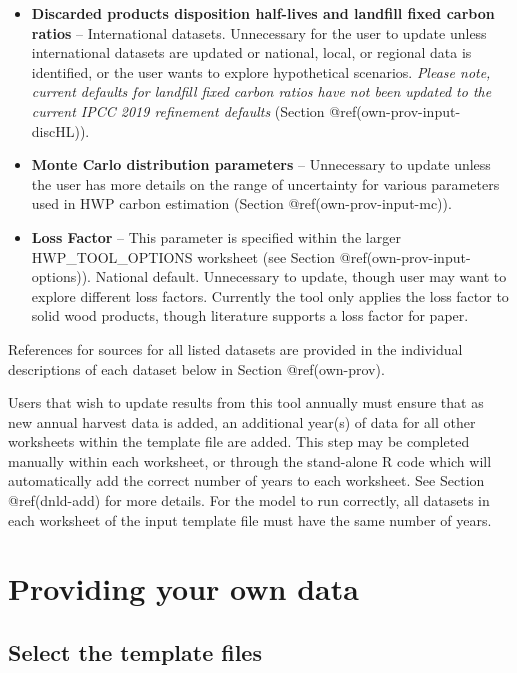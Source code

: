 \documentclass[
  openany]{book}
\begin{document}
\begin{itemize}
\item
  \textbf{Discarded products disposition half-lives and landfill fixed
  carbon ratios} -- International datasets. Unnecessary for the user to
  update unless international datasets are updated or national, local,
  or regional data is identified, or the user wants to explore
  hypothetical scenarios. \emph{Please note, current defaults for
  landfill fixed carbon ratios have not been updated to the current IPCC
  2019 refinement defaults} (Section @ref(own-prov-input-discHL)).
\item
  \textbf{Monte Carlo distribution parameters} -- Unnecessary to update
  unless the user has more details on the range of uncertainty for
  various parameters used in HWP carbon estimation (Section
  @ref(own-prov-input-mc)).
\item
  \textbf{Loss Factor} -- This parameter is specified within the larger
  HWP\_TOOL\_OPTIONS worksheet (see Section
  @ref(own-prov-input-options)). National default. Unnecessary to
  update, though user may want to explore different loss factors.
  Currently the tool only applies the loss factor to solid wood
  products, though literature supports a loss factor for paper.
\end{itemize}

References for sources for all listed datasets are provided in the
individual descriptions of each dataset below in Section @ref(own-prov).

Users that wish to update results from this tool annually must ensure
that as new annual harvest data is added, an additional year(s) of data
for all other worksheets within the template file are added. This step
may be completed manually within each worksheet, or through the
stand-alone R code which will automatically add the correct number of
years to each worksheet. See Section @ref(dnld-add) for more details.
For the model to run correctly, all datasets in each worksheet of the
input template file must have the same number of years.

\hypertarget{own-prov}{%
\section{Providing your own data}\label{own-prov}}

\hypertarget{own-prov-temp}{%
\subsection{Select the template files}\label{own-prov-temp}}
\end{document}
